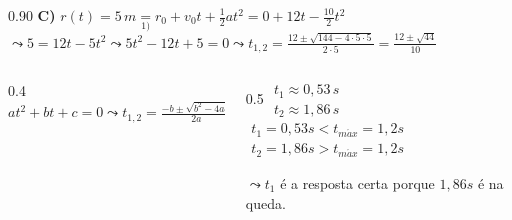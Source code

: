 \documentclass{beamer}
\begin{document}
\begin{frame}{}
\begin{columns}[T]
\begin{column}{0.90\textwidth}
			\vspace{0.1cm}
			\textbf{C)} \quad $\displaystyle r(t) = 5\,m \underset{1)}{=} r_0 + v_0 t + \frac{1}{2} a t^2 = 0 + 12t - \frac{10}{2}t^2$
			$\displaystyle \leadsto  5 = 12t - 5t^2  \leadsto  5t^2 - 12t + 5 = 0  \leadsto  t_{1,2} = \frac{12 \pm \sqrt{144 - 4 \cdot 5 \cdot 5}}{2 \cdot 5} = \frac{12 \pm \sqrt{44}}{10}$
		\end{column}
	\end{columns}
	
	\vspace{0.2cm}
	\begin{columns}[c]
		\begin{column}{0.4\textwidth}
			\tiny $at^2+bt+c=0 \leadsto t_{1,2}=\frac{-b \pm \sqrt{b^2-4ac}}{2a}$
		\end{column}
		\begin{column}{0.5\textwidth}
			\tiny $\begin{array}{l} t_1 \approx 0,53\,s \\ t_2 \approx 1,86\,s \end{array}$ \quad
			$\begin{array}{l} t_1 = 0,53s < t_{m\acute{a}x} = 1,2s \\ t_2 = 1,86s > t_{m\acute{a}x} = 1,2s \end{array}$
			
			\vspace{0.1cm}
			$\leadsto t_1$ é a resposta certa porque $1,86s$ é na queda.
		\end{column}
	\end{columns}
\end{frame}
\end{document}
